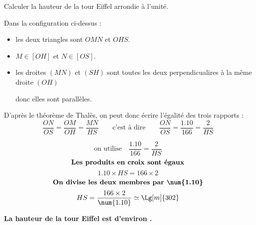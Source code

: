 \begin{corrige}
\begin{minipage}{0.55\linewidth}
        \medskip
        Calculer la hauteur de la tour Eiffel arrondie à l'unité.
    \end{minipage}

    \medskip
    {\color{red}
    Dans la configuration ci-dessus : 
    \begin{itemize}
        \item les deux triangles sont $OMN$ et $OHS$.
        \item $M \in [OH]$ et $N \in [OS]$.
        \item les droites $(MN)$ et $(SH)$ sont toutes les deux perpendicualires à la même droite $(OH)$
        
        donc elles sont parallèles.                
    \end{itemize}
    D'après le théorème de Thalès, on peut donc écrire l'égalité des trois rapports :
    $$\frac{ON}{OS}=\frac{OM}{OH}=\frac{MN}{HS}\qquad\mbox{c'est à dire}\qquad\frac{ON}{OS}=\frac{\num{1.10}}{166}=\frac{2}{HS}$$
    
        $$\mbox{on utilise} \quad \dfrac{\num{1.10}}{166}=\dfrac{2}{HS}$$
        $$\mbox{\bf Les produits en croix sont égaux}$$
        $$\num{1.10}\times HS=166\times 2$$
        $$\mbox{\bf On divise les deux membres par \num{1.10}}$$                
        $$HS=\frac{166\times 2}{\num{1.10}}\simeq\Lg[m]{302}$$ 
        
        \textbf{La hauteur de la tour Eiffel est d'environ .}
    }
\end{corrige}

